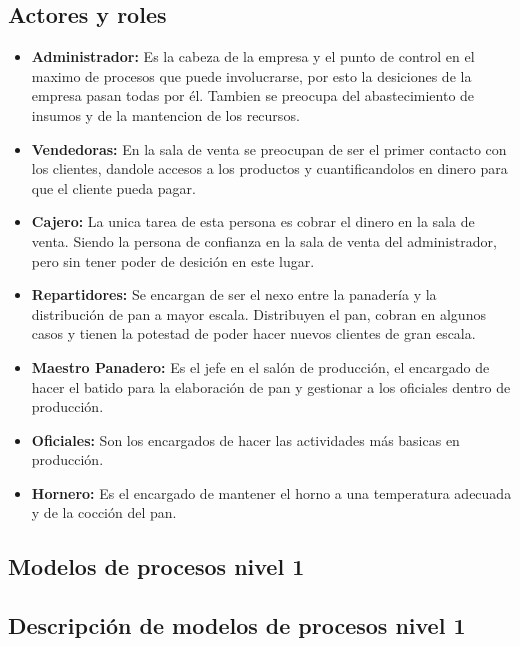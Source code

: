 \subsection{Actores y roles}
\begin{itemize}
\item \textbf{Administrador:} Es la cabeza de la empresa y el punto de control en el maximo de procesos que puede involucrarse, por esto la desiciones de la empresa pasan todas por él. Tambien se preocupa del abastecimiento de insumos y de la mantencion de los recursos. 

\item \textbf{Vendedoras:} En la sala de venta se preocupan de ser el primer contacto con los clientes, dandole accesos a los productos y cuantificandolos en dinero para que el cliente pueda pagar.

\item \textbf{Cajero:} La unica tarea de esta persona es cobrar el dinero en la sala  de venta. Siendo  la persona de confianza en la sala de venta del administrador, pero sin tener poder de desición en este lugar.

\item \textbf{Repartidores:} Se encargan de ser el nexo entre la panadería y la distribución de pan a mayor escala. Distribuyen el pan, cobran en algunos casos y tienen la potestad de poder hacer nuevos clientes de gran escala.

\item \textbf{Maestro Panadero:} Es el jefe en el salón de producción, el encargado de hacer el batido para la elaboración de pan y gestionar a los oficiales dentro de producción. 

\item \textbf{Oficiales:} Son los encargados de hacer las actividades más basicas en producción.

\item \textbf{Hornero:} Es el encargado de mantener el horno a una temperatura adecuada y de la cocción del pan.
\end{itemize}

\subsection{Modelos de procesos nivel 1}

\subsection{Descripción de modelos de procesos nivel 1} 
